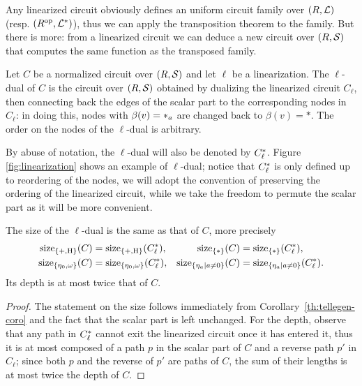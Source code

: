 Any linearized circuit obviously defines an uniform circuit family
over $(R,\mathcal{L})$ (resp. $(R^{\mathrm{op}},\mathcal{L}^\ast)$), thus we can apply
the transposition theorem to the family. But there is more: from a
linearized circuit we can deduce a new circuit over $(R,\mathcal{S})$ that
computes the same function as the transposed family.

\begin{definition}
  \label{def:ell-dual}
  Let $C$ be a normalized circuit over $(R,\mathcal{S})$ and let $\ell$ be
  a linearization.  The $\ell$-dual of $C$ is the circuit over
  $(R,\mathcal{S})$ obtained by dualizing the linearized circuit $C_\ell$,
  then connecting back the edges of the scalar part to the
  corresponding nodes in $C_\ell$: in doing this, nodes with
  $\beta(v)=*_{a}$ are changed back to $\beta(v)=*$. The order on
  the nodes of the $\ell$-dual is arbitrary.
\end{definition}

By abuse of notation, the $\ell$-dual will also be denoted by
$C_\ell^\ast$. Figure \ref{fig:linearization} shows an example of
$\ell$-dual; notice that $C_\ell^\ast$ is only defined up to
reordering of the nodes, we will adopt the convention of preserving
the ordering of the linearized circuit, while we take the freedom to
permute the scalar part as it will be more convenient.

\begin{proposition}
  \label{th:tellegen-multi}
  The size of the $\ell$-dual is the same as that of $C$, more
  precisely
  \begin{align*}
    \operatorname{size}_{\{+,\operatorname{H}\}}(C) &= \operatorname{size}_{\{+,\operatorname{H}\}}(C_\ell^\ast), 
    &\operatorname{size}_{\{*\}}(C) &= \operatorname{size}_{\{*\}}(C_\ell^\ast),\\
    \operatorname{size}_{\{\eta_0,\omega\}}(C) &= \operatorname{size}_{\{\eta_0,\omega\}}(C_\ell^\ast), 
    &\operatorname{size}_{\{\eta_a|a\ne0\}}(C) &= \operatorname{size}_{\{\eta_a|a\ne0\}}(C_\ell^\ast).
  \end{align*}
  Its depth is at most twice that of $C$.
\end{proposition}
\begin{proof}
    The statement on the size follows
  immediately from Corollary~\ref{th:tellegen-coro} and the fact that
  the scalar part is left unchanged. For the depth, observe that any
  path in $C_\ell^\ast$ cannot exit the linearized circuit once it
  has entered it, thus it is at most composed of a path $p$ in the
  scalar part of $C$ and a reverse path $p'$ in $C_\ell$; since both
  $p$ and the reverse of $p'$ are paths of $C$, the sum of their
  lengths is at most twice the depth of $C$.
\end{proof}

